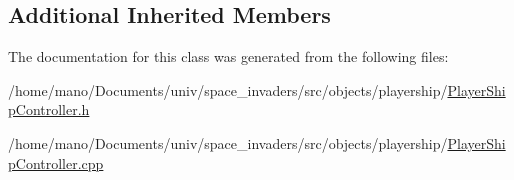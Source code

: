 \subsection*{Additional Inherited Members}


The documentation for this class was generated from the following files\+:\begin{DoxyCompactItemize}
\item 
/home/mano/\+Documents/univ/space\+\_\+invaders/src/objects/playership/\hyperlink{PlayerShipController_8h}{Player\+Ship\+Controller.\+h}\item
/home/mano/\+Documents/univ/space\+\_\+invaders/src/objects/playership/\hyperlink{PlayerShipController_8cpp}{Player\+Ship\+Controller.\+cpp}\end{DoxyCompactItemize}
